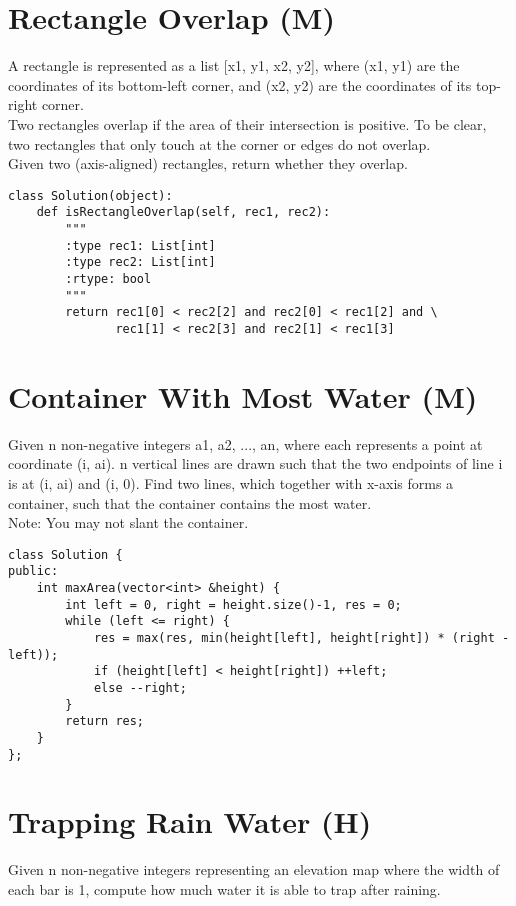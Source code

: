 \section{Rectangle Overlap (M)}
A rectangle is represented as a list [x1, y1, x2, y2], where (x1, y1) are the coordinates of its bottom-left corner, and (x2, y2) are the coordinates of its top-right corner.\\

Two rectangles overlap if the area of their intersection is positive.  To be clear, two rectangles that only touch at the corner or edges do not overlap.\\

Given two (axis-aligned) rectangles, return whether they overlap.\\
\begin{lstlisting}
class Solution(object):
    def isRectangleOverlap(self, rec1, rec2):
        """
        :type rec1: List[int]
        :type rec2: List[int]
        :rtype: bool
        """
        return rec1[0] < rec2[2] and rec2[0] < rec1[2] and \
               rec1[1] < rec2[3] and rec2[1] < rec1[3]
\end{lstlisting}


\section{Container With Most Water (M)}
Given n non-negative integers a1, a2, ..., an, where each represents a point at coordinate (i, ai). n vertical lines are drawn such that the two endpoints of line i is at (i, ai) and (i, 0). Find two lines, which together with x-axis forms a container, such that the container contains the most water.\\

Note: You may not slant the container. \\

\begin{lstlisting}
class Solution {
public:
    int maxArea(vector<int> &height) {
        int left = 0, right = height.size()-1, res = 0;
        while (left <= right) {
            res = max(res, min(height[left], height[right]) * (right - left));
            if (height[left] < height[right]) ++left;
            else --right;
        }
        return res;
    }
};
\end{lstlisting}


\section {Trapping Rain Water (H)}
Given n non-negative integers representing an elevation map where the width of each bar is 1, compute how much water it is able to trap after raining.\\

